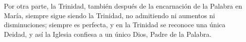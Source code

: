 \begin{body}
	Por otra parte, la Trinidad, también después de la encarnación de la Palabra en María, siempre sigue siendo la Trinidad, no admitiendo ni aumentos ni disminuciones; siempre es perfecta, y en la Trinidad se reconoce una única Deidad, y así la Iglesia confiesa a un único Dios, Padre de la Palabra.
\end{body}
